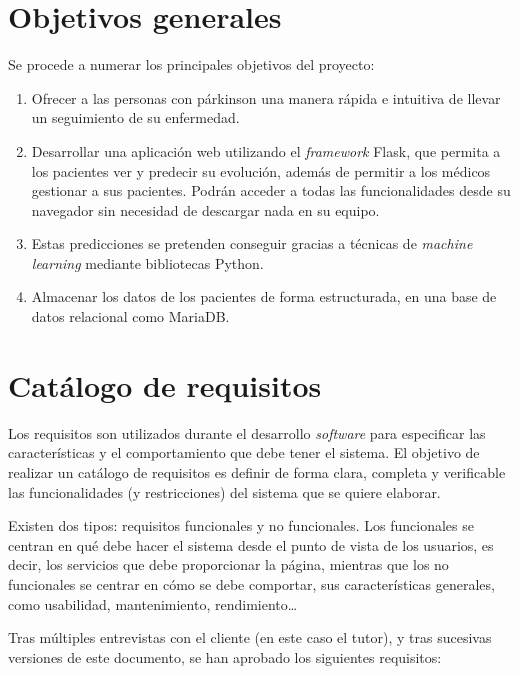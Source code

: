 \section{Objetivos generales}
Se procede a numerar los principales objetivos del proyecto:
\begin{enumerate}
    \item Ofrecer a las personas con párkinson una manera rápida e intuitiva de llevar un seguimiento de su enfermedad.
    \item Desarrollar una aplicación web utilizando el \textit{framework} Flask, que permita a los pacientes ver y predecir su evolución, además de permitir a los médicos gestionar a sus pacientes. Podrán acceder a todas las funcionalidades desde su navegador sin necesidad de descargar nada en su equipo.
    \item Estas predicciones se pretenden conseguir gracias a técnicas de \textit{machine learning} mediante bibliotecas Python. 
    \item Almacenar los datos de los pacientes de forma estructurada, en una base de datos relacional como MariaDB.
\end{enumerate}


\section{Catálogo de requisitos}\label{sec:catalogo}
Los requisitos son utilizados durante el desarrollo \textit{software} para especificar las características y el comportamiento que debe tener el sistema. El objetivo de realizar un catálogo de requisitos es definir de forma clara, completa y verificable las funcionalidades (y restricciones) del sistema que se quiere elaborar.

Existen dos tipos: requisitos funcionales y no funcionales. Los funcionales se centran en qué debe hacer el sistema desde el punto de vista de los usuarios, es decir, los servicios que debe proporcionar la página, mientras que los no funcionales se centrar en cómo se debe comportar, sus características generales, como usabilidad, mantenimiento, rendimiento\ldots 

Tras múltiples entrevistas con el cliente (en este caso el tutor), y tras sucesivas versiones de este documento, se han aprobado los siguientes requisitos:


